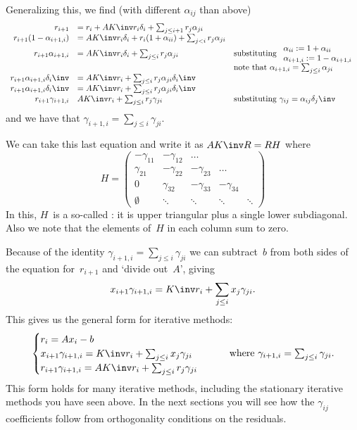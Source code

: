 Generalizing this, we find (with different $\alpha_{ij}$ than above)
\[ 
\begin{array}{rll}
  r_{i+1}&=r_i+AK\inv r_i\delta_i+\sum_{j\leq i+1}r_j\alpha_{ji}\\
  r_{i+1}(1-\alpha_{i+1,i})&=AK\inv r_i\delta_i +r_i(1+\alpha_{ii})
      +\sum_{j< i} r_j\alpha_{ji}\\
  r_{i+1}\alpha_{i+1,i}&=AK\inv r_i\delta_i +
      \sum_{j\leq i}r_j\alpha_{ji}
      &\vtop{
        \hbox{substituting $\begin{array}{ll}\alpha_{ii}:=1+\alpha_{ii}\\
        \alpha_{i+1,i}:=1-\alpha_{i+1,i}\end{array}$}
        \hbox{note that $\alpha_{i+1,i}=\sum_{j\leq i}\alpha_{ji}$}
        }\\
  r_{i+1}\alpha_{i+1,i}\delta_i\inv&=AK\inv r_i +\sum_{j\leq i}
  r_j\alpha_{ji}\delta_i\inv\\  
  r_{i+1}\alpha_{i+1,i}\delta_i\inv&=AK\inv r_i +\sum_{j\leq i}
      r_j\alpha_{ji}\delta_i\inv\\
  r_{i+1}\gamma_{i+1,i}&AK\inv r_i+\sum_{j\leq i} r_j\gamma_{ji}
      &\hbox{substituting $\gamma_{ij}=\alpha_{ij}\delta_j\inv$}
\end{array}
\]
and we have that $\gamma_{i+1,i}=\sum_{j\leq i}\gamma_{ji}$.

We can take this last equation and write it as $AK\inv R=RH$ where
\[ H=
\begin{pmatrix}
  -\gamma_{11}&-\gamma_{12}&\ldots\\
  \gamma_{21}&-\gamma_{22}&-\gamma_{23}&\ldots\\
  0&\gamma_{32}&-\gamma_{33}&-\gamma_{34}\\
  \emptyset&\ddots&\ddots&\ddots&\ddots
\end{pmatrix}
\]
In this, $H$~is a so-called : it is upper
triangular plus a single lower subdiagonal. Also we note that the
elements of~$H$ in each column sum to zero.

Because of the identity $\gamma_{i+1,i}=\sum_{j\leq i}\gamma_{ji}$ we
can subtract~$b$ from both sides of the equation for~$r_{i+1}$ and
`divide out~$A$', giving
\[
  x_{i+1}\gamma_{i+1,i}=K\inv r_i+\sum_{j\leq i} x_j\gamma_{ji}.
\]
This gives us the general form for iterative methods:
\begin{equation}
  \begin{cases}
    r_i = Ax_i-b\\
    x_{i+1}\gamma_{i+1,i}=K\inv r_i+\sum_{j\leq i} x_j\gamma_{ji}\\
    r_{i+1}\gamma_{i+1,i}=AK\inv r_i+\sum_{j\leq i} r_j\gamma_{ji}
  \end{cases}\qquad
  \hbox{where $\gamma_{i+1,i}=\sum_{j\leq i}\gamma_{ji}$}.
  \label{eq:general-xr-hessenberg}
\end{equation}
This form holds for many iterative methods, including the stationary
iterative methods you have seen above. In the next sections you will
see how the $\gamma_{ij}$ coefficients follow from orthogonality
conditions on the residuals.

